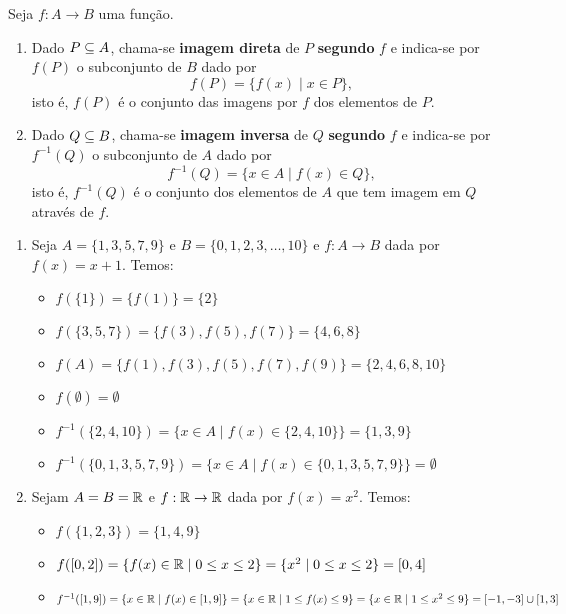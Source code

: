 \begin{definicao}
	Seja $f : A \to B$ uma fun{\c c}{\~a}o.
	\begin{enumerate}
		\item Dado $P \subseteq A$, chama-se \textbf{imagem direta} de $P$  \textbf{segundo} $f$ e indica-se por $f(P)$ o subconjunto de $B$ dado por
		\[
			f(P) = \{f(x) \mid x \in P\},
		\]
		isto {\'e}, $f(P)$ {\'e} o conjunto das imagens por $f$ dos elementos de $P$.

		\item Dado $Q \subseteq B$, chama-se \textbf{imagem inversa} de $Q$ \textbf{segundo} $f$ e indica-se por $f^{-1}(Q)$ o subconjunto de $A$ dado por
		\[
			f^{-1}(Q) = \{x \in A \mid f(x) \in Q\},
		\]
		isto {\'e}, $f^{-1}(Q)$ {\'e} o conjunto dos elementos de $A$ que tem imagem em $Q$ atrav{\'e}s de $f$.
	\end{enumerate}
\end{definicao}

\begin{exemplos}
	\begin{enumerate}[label={\arabic*})]
		\item Seja $A = \{1, 3, 5, 7, 9 \}$ e $B = \{0, 1, 2, 3, \dots, 10\}$ e $f : A \to B$ dada por $f(x) = x + 1$. Temos:
		\begin{itemize}
			\item $f(\{1\}) = \{f(1)\} = \{2\}$

			\item $f(\{3, 5, 7\}) = \{f(3), f(5), f(7)\} = \{4, 6, 8\}$

			\item $f(A) = \{f(1), f(3), f(5), f(7), f(9)\} = \{2, 4, 6, 8, 10\}$

			\item $f(\emptyset) = \emptyset$

			\item $f^{-1}(\{2, 4, 10\}) = \{x \in A \mid f(x) \in \{2, 4, 10\}\} = \{1, 3, 9\}$

			\item $f^{-1}(\{0, 1, 3, 5, 7, 9\}) = \{x \in A \mid f(x) \in \{0, 1, 3, 5, 7, 9\}\} = \emptyset$
		\end{itemize}

		\item Sejam $A = B = \mathbb{R}$ e $f : \mathbb{R} \to \mathbb{R}$ dada por $f(x) = x^2$. Temos:
		\begin{itemize}
			\item $f(\{1, 2, 3\}) = \{1, 4, 9\}$

			\item $f([0,2]) = \{f(x) \in \mathbb{R} \mid 0 \le x \le 2 \} = \{x^2 \mid 0 \le x \le 2\} = [0, 4]$

			\item $f^{-1}([1, 9]) = \{x \in \mathbb{R} \mid f(x) \in [1, 9]\} = \{ x \in \mathbb{R} \mid 1 \le f(x) \le 9\} = \{x \in \mathbb{R} \mid 1 \le x^2 \le 9\} = [-1, -3] \cup [1, 3]$
		\end{itemize}
	\end{enumerate}
\end{exemplos}

